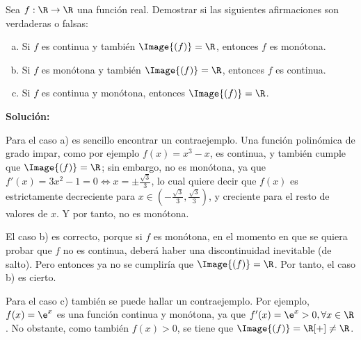 \documentclass[../../main.tex]{subfiles}
\begin{document}
  \begin{shaded}
    Sea $f: \R \to \R$ una función real. Demostrar si las siguientes afirmaciones son verdaderas o falsas:

    \begin{enumerate}[a)]
    \item Si $f$ es continua y también $\Image{(f)} = \R$, entonces $f$ es monótona.
    \item Si $f$ es monótona y también $\Image{(f)} = \R$, entonces $f$ es continua.
    \item Si $f$ es continua y monótona, entonces $\Image{(f)} = \R$.
    \end{enumerate}
  \end{shaded}

  \textbf{Solución:}

  Para el caso a) es sencillo encontrar un contraejemplo. Una función polinómica de grado impar, como por ejemplo $f(x) = x^3 - x$, es continua, y también cumple que $\Image{(f)} = \R$; sin embargo, no es monótona, ya que $f'(x) = 3x^2 - 1 = 0 \iff x = \pm \displaystyle\frac{\sqrt{3}}{3}$, lo cual quiere decir que $f(x)$ es estrictamente decreciente para $x \in \left(-\displaystyle\frac{\sqrt{3}}{3}, \displaystyle\frac{\sqrt{3}}{3}\right)$, y creciente para el resto de valores de $x$. Y por tanto, no es monótona.

  El caso b) es correcto, porque si $f$ es monótona, en el momento en que se quiera probar que $f$ no es continua, deberá haber una discontinuidad inevitable (de salto). Pero entonces ya no se cumpliría que $\Image{(f)} = \R$. Por tanto, el caso b) es cierto.

  Para el caso c) también se puede hallar un contraejemplo. Por ejemplo, $f(x) = \e^x$ es una función continua y monótona, ya que $f'(x) = \e^x > 0, \forall x \in \R$. No obstante, como también $f(x) > 0$, se tiene que $\Image{(f)} = \R[+] \ne \R$.
\end{document}
